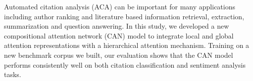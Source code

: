 Automated citation analysis (ACA) can be important for many applications including author ranking and literature based information retrieval, extraction, summarization and question answering. In this study, we developed a new compositional attention network (CAN) model to integrate local and global attention representations with a hierarchical attention mechanism. Training on a new benchmark corpus we built, our evaluation shows that the CAN model performs consistently well on both citation classification and sentiment analysis tasks.
